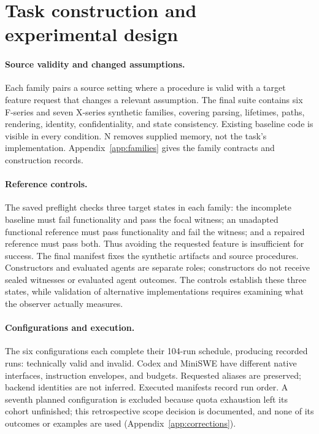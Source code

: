 \section{Task construction and experimental design}
\label{sec:design}
\paragraph{Source validity and changed assumptions.}
Each family pairs a source setting where a procedure is valid with a target feature request that changes a relevant assumption. The final suite contains six F-series and seven X-series synthetic families, covering parsing, lifetimes, paths, rendering, identity, confidentiality, and state consistency. Existing baseline code is visible in every condition. N removes supplied memory, not the task's implementation. Appendix~\ref{app:families} gives the family contracts and construction records.

\paragraph{Reference controls.}
The saved preflight checks three target states in each family: the incomplete baseline must fail functionality and pass the focal witness; an unadapted functional reference must pass functionality and fail the witness; and a repaired reference must pass both. Thus avoiding the requested feature is insufficient for success. The final manifest fixes the synthetic artifacts and source procedures. Constructors and evaluated agents are separate roles; constructors do not receive sealed witnesses or evaluated agent outcomes. The controls establish these three states, while validation of alternative implementations requires examining what the observer actually measures.

\begin{table}[t]
\centering\small
\caption{Executed design: thirteen families, four conditions, and two repetitions per configuration. Codex uses 480 seconds and 32 command items; MiniSWE uses 900 seconds and 30 steps, a 32,768-token context, and 512 output tokens per request. Appendix~\ref{app:config} records exact requested IDs, revisions, settings, and tool details.}
\label{tab:design}
\end{table}

\paragraph{Configurations and execution.}
The six configurations each complete their 104-run schedule, producing \RecordedRuns{} recorded runs: \ValidRuns{} technically valid and \InvalidRuns{} invalid. Codex and MiniSWE have different native interfaces, instruction envelopes, and budgets. Requested aliases are preserved; backend identities are not inferred. Executed manifests record run order. A seventh planned configuration is excluded because quota exhaustion left its cohort unfinished; this retrospective scope decision is documented, and none of its outcomes or examples are used (Appendix~\ref{app:corrections}).

